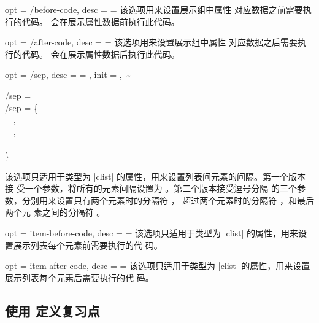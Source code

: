 \documentclass[full]{l3doc}
\begin{document}
\begin{documentation}
\begin{option}{
  opt = {/before-code},
  desc = {= }
}
  该选项用来设置展示组中属性  对应数据之前需要执行的代码。
  会在展示属性数据前执行此代码。
\end{option}

\begin{option}{
  opt = {/after-code},
  desc = {= }
}
  该选项用来设置展示组中属性  对应数据之后需要执行的代码。
  会在展示属性数据后执行此代码。
\end{option}

\begin{option}{
  opt = {/sep},
  desc = {= },
  init = {,~\~}
}
\begin{Syntax}
  /sep =  \\
  /sep = \{ \\
  ~~, \\
  ~~, \\
  ~~ \\
  \}
\end{Syntax}

  该选项只适用于类型为 |clist| 的属性，用来设置列表间元素的间隔。第一个版本接
  受一个参数，将所有的元素间隔设置为 。第二个版本接受逗号分隔
  的三个参数，分别用来设置只有两个元素时的分隔符 ，
  超过两个元素时的分隔符 ，和最后两个元
  素之间的分隔符 。

\end{option}

\begin{option}{
  opt = item-before-code,
  desc = {= }
}
  该选项只适用于类型为 |clist| 的属性，用来设置展示列表每个元素前需要执行的代
  码。
\end{option}

\begin{option}{
  opt = item-after-code,
  desc = {= }
}
  该选项只适用于类型为 |clist| 的属性，用来设置展示列表每个元素后需要执行的代
  码。
\end{option}

\subsection{使用  定义复习点}


\end{documentation}
\end{document}
